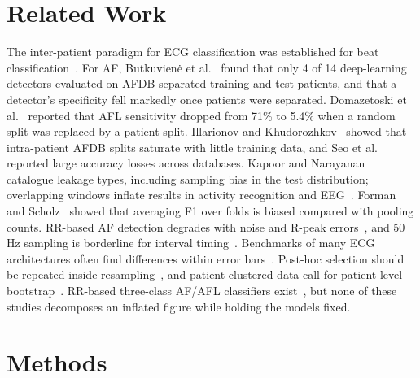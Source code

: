 \documentclass[conference,a4paper]{IEEEtran}
\begin{document}
\section{Related Work}
The inter-patient paradigm for ECG classification was established for beat classification~\cite{dechazal2004,luz2016}. For AF,
Butkuvien\.{e} et al.~\cite{butkuviene2021} found that only 4 of 14 deep-learning detectors evaluated on AFDB separated training
and test patients, and that a detector's specificity fell markedly once patients were separated. Domazetoski et
al.~\cite{domazetoski2022} reported that AFL sensitivity dropped from 71\% to 5.4\% when a random split was replaced by a patient
split. Illarionov and Khudorozhkov~\cite{illarionov2018} showed that intra-patient AFDB splits saturate with little training data,
and Seo et al.~\cite{seo2021} reported large accuracy losses across databases. Kapoor and Narayanan~\cite{kapoor2023} catalogue
leakage types, including sampling bias in the test distribution; overlapping windows inflate results in activity recognition and
EEG~\cite{dehghani2019,brookshire2024}. Forman and Scholz~\cite{forman2010} showed that averaging F1 over folds is biased compared
with pooling counts. RR-based AF detection degrades with noise and R-peak errors~\cite{oster2015}, and 50\,Hz sampling is
borderline for interval timing~\cite{kwon2018,ellis2015}. Benchmarks of many ECG architectures often find differences within
error bars~\cite{strodthoff2021,clifford2017}. Post-hoc selection should be repeated inside resampling~\cite{tsamardinos2018,
cawley2010}, and patient-clustered data call for patient-level bootstrap~\cite{rutter2000}. RR-based three-class AF/AFL
classifiers exist~\cite{ivanovic2019,faust2021}, but none of these studies decomposes an inflated figure while holding the models
fixed.

\section{Methods}
\end{document}
